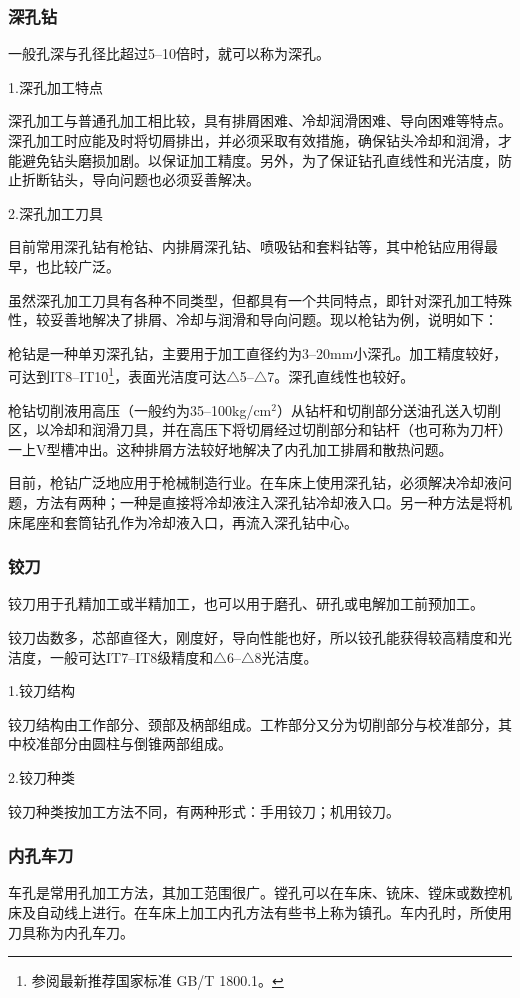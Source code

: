 \documentclass{ctexbook}
\begin{document}
\subsubsection{深孔钻}
一般孔深与孔径比超过5--10倍时，就可以称为深孔。

1.深孔加工特点

深孔加工与普通孔加工相比较，具有排屑困难、冷却润滑困难、导向困难等特点。深孔加工时应能及时将切屑排出，并必须采取有效措施，确保钻头冷却和润滑，才能避免钻头磨损加剧。以保证加工精度。另外，为了保证钻孔直线性和光洁度，防止折断钻头，导向问题也必须妥善解决。

2.深孔加工刀具

目前常用深孔钻有枪钻、内排屑深孔钻、喷吸钻和套料钻等，其中枪钻应用得最早，也比较广泛。

虽然深孔加工刀具有各种不同类型，但都具有一个共同特点，即针对深孔加工特殊性，较妥善地解决了排屑、冷却与润滑和导向问题。现以枪钻为例，说明如下：

枪钻是一种单刃深孔钻，主要用于加工直径约为3--20mm小深孔。加工精度较好，可达到IT8--IT10\footnote{参阅最新推荐国家标准 GB/T 1800.1。}，表面光洁度可达$\bigtriangleup$5--$\bigtriangleup$7。深孔直线性也较好。

枪钻切削液用高压（一般约为35--100kg/cm$^2$）从钻杆和切削部分送油孔送入切削区，以冷却和润滑刀具，并在高压下将切屑经过切削部分和钻杆（也可称为刀杆）一上V型槽冲出。这种排屑方法较好地解决了内孔加工排屑和散热问题。

目前，枪钻广泛地应用于枪械制造行业。在车床上使用深孔钻，必须解决冷却液问题，方法有两种；一种是直接将冷却液注入深孔钻冷却液入口。另一种方法是将机床尾座和套筒钻孔作为冷却液入口，再流入深孔钻中心。
\subsubsection{铰刀}
铰刀用于孔精加工或半精加工，也可以用于磨孔、研孔或电解加工前预加工。

铰刀齿数多，芯部直径大，刚度好，导向性能也好，所以铰孔能获得较高精度和光洁度，一般可达IT7--IT8级精度和$\bigtriangleup$6--$\bigtriangleup$8光洁度。

1.铰刀结构

铰刀结构由工作部分、颈部及柄部组成。工柞部分又分为切削部分与校准部分，其中校准部分由圆柱与倒锥两部组成。

2.铰刀种类

铰刀种类按加工方法不同，有两种形式：手用铰刀；机用铰刀。
\subsubsection{内孔车刀}
车孔是常用孔加工方法，其加工范围很广。镗孔可以在车床、铳床、镗床或数控机床及自动线上进行。在车床上加工内孔方法有些书上称为镇孔。车内孔时，所使用刀具称为内孔车刀。
\end{document}
